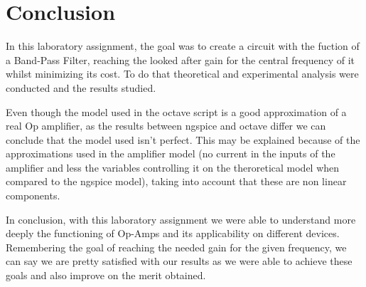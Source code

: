 \section{Conclusion}
\label{sec:conclusion}

\par In this laboratory assignment, the goal was to create a circuit with the fuction of a Band-Pass Filter, reaching the looked after gain for the central frequency of it whilst minimizing its cost. To do that theoretical and experimental analysis were conducted and the results studied.

\par Even though the model used in the octave script is a good approximation of a real Op amplifier, as the results between ngspice and octave differ  we can conclude that the model used isn't perfect. This may be explained because of the approximations used in the amplifier model (no current in the inputs of the amplifier and less the variables controlling it on the theroretical model when compared to the ngspice model), taking into account that these are non linear components. 
 
\par In conclusion, with this laboratory assignment we were able to understand more deeply the functioning of Op-Amps and its applicability on different devices. Remembering the goal of reaching the needed gain for the given frequency, we can say we are pretty satisfied with our results as we were able to achieve these goals and also improve on the merit obtained.








